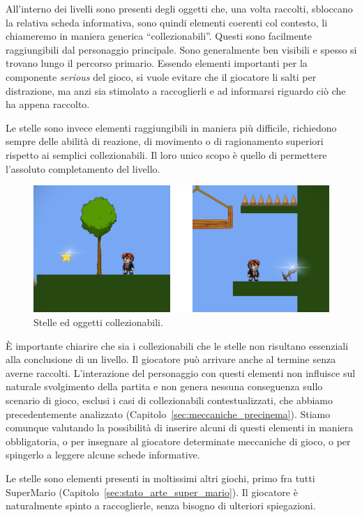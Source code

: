 All’interno dei livelli sono presenti degli oggetti che, una volta raccolti, sbloccano la relativa scheda informativa, sono quindi elementi coerenti col contesto, li chiameremo in maniera generica “collezionabili”. Questi sono facilmente raggiungibili dal personaggio principale. Sono generalmente ben visibili e spesso si trovano lungo il percorso primario. Essendo elementi importanti per la componente \textit{serious} del gioco, si vuole evitare che il giocatore li salti per distrazione, ma anzi sia stimolato a raccoglierli e ad informarsi riguardo ciò che ha appena raccolto.

Le stelle sono invece elementi raggiungibili in maniera più difficile, richiedono sempre delle abilità di reazione, di movimento o di ragionamento superiori rispetto ai semplici collezionabili. Il loro unico scopo è quello di permettere l’assoluto completamento del livello.

\begin{figure}%
	\centering
	\includegraphics[width= 0.9\columnwidth]{images/gameDesign/25_stelle_collezionabili.jpg}
	\caption{Stelle ed oggetti collezionabili.}
	\label{fig:rigiocabilita_stelle_collezionabili}
\end{figure} 

È importante chiarire che sia i collezionabili che le stelle non risultano essenziali alla conclusione di un livello. Il giocatore può arrivare anche al termine senza averne raccolti. L’interazione del personaggio con questi elementi non influisce sul naturale svolgimento della partita e non genera nessuna conseguenza sullo scenario di gioco, esclusi i casi di collezionabili contestualizzati, che abbiamo precedentemente analizzato (Capitolo~\ref{sec:meccaniche_precinema}). Stiamo comunque valutando la possibilità di inserire alcuni di questi elementi in maniera obbligatoria, o per insegnare al giocatore determinate meccaniche di gioco, o per spingerlo a leggere alcune schede informative.

Le stelle sono elementi presenti in moltissimi altri giochi, primo fra tutti SuperMario (Capitolo~\ref{sec:stato_arte_super_mario}). Il giocatore è naturalmente spinto a raccoglierle, senza bisogno di ulteriori spiegazioni.

